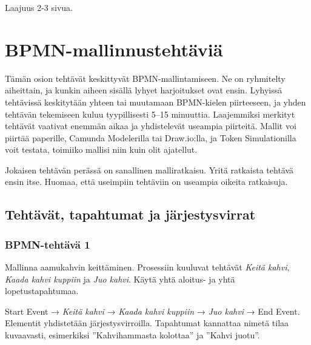 \documentclass[
  finnish,
  letterpaper,
  DIV=11,
  numbers=noendperiod,
  oneside]{scrreprt}
\begin{document}
Laajuus 2-3 sivua.

\section{BPMN-mallinnustehtäviä}\label{bpmn-mallinnustehtuxe4viuxe4}

Tämän osion tehtävät keskittyvät BPMN-mallintamiseen. Ne on ryhmitelty
aiheittain, ja kunkin aiheen sisällä lyhyet harjoitukset ovat ensin.
Lyhyissä tehtävissä keskitytään yhteen tai muutamaan BPMN-kielen
piirteeseen, ja yhden tehtävän tekemiseen kuluu tyypillisesti 5--15
minuuttia. Laajemmiksi merkityt tehtävät vaativat enemmän aikaa ja
yhdistelevät useampia piirteitä. Mallit voi piirtää paperille, Camunda
Modelerilla tai Draw.io:lla, ja Token Simulationilla voit testata,
toimiiko mallisi niin kuin olit ajatellut.

Jokaisen tehtävän perässä on sanallinen malliratkaisu. Yritä ratkaista
tehtävä ensin itse. Huomaa, että useimpiin tehtäviin on useampia oikeita
ratkaisuja.

\subsection{Tehtävät, tapahtumat ja
järjestysvirrat}\label{tehtuxe4vuxe4t-tapahtumat-ja-juxe4rjestysvirrat}

\subsubsection{BPMN-tehtävä 1}\label{bpmn-tehtuxe4vuxe4-1}

Mallinna aamukahvin keittäminen. Prosessiin kuuluvat tehtävät
\emph{Keitä kahvi}, \emph{Kaada kahvi kuppiin} ja \emph{Juo kahvi}.
Käytä yhtä aloitus- ja yhtä lopetustapahtumaa.

\begin{tcolorbox}[enhanced jigsaw, arc=.35mm, bottomrule=.15mm, bottomtitle=1mm, breakable, colback=white, colbacktitle=quarto-callout-tip-color!10!white, colframe=quarto-callout-tip-color-frame, coltitle=black, left=2mm, leftrule=.75mm, opacityback=0, opacitybacktitle=0.6, rightrule=.15mm, title=\textcolor{quarto-callout-tip-color}{\faLightbulb}\hspace{0.5em}{Malliratkaisu}, titlerule=0mm, toprule=.15mm, toptitle=1mm]

Start Event → \emph{Keitä kahvi} → \emph{Kaada kahvi kuppiin} →
\emph{Juo kahvi} → End Event. Elementit yhdistetään järjestysvirroilla.
Tapahtumat kannattaa nimetä tilaa kuvaavasti, esimerkiksi
''Kahvihammasta kolottaa'' ja ''Kahvi juotu''.

\end{tcolorbox}
\end{document}
